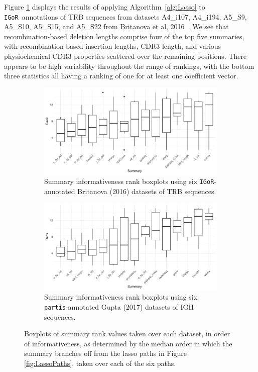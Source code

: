 \documentclass{article}
\newcommand{\partis}{\texttt{partis}}
\newcommand{\igor}{\texttt{IGoR}}
\begin{document}
Figure \ref{fig:IgorLassoScores} displays the results of applying Algorithm~\ref{alg:Lasso} to \igor\ annotations of TRB sequences from datasets A4\_i107, A4\_i194, A5\_S9, A5\_S10, A5\_S15, and A5\_S22 from Britanova et al, 2016~\cite{Britanova2016-iw}.
We see that recombination-based deletion lengths comprise four of the top five summaries, with recombination-based insertion lengths, CDR3 length, and various physiochemical CDR3 properties scattered over the remaining positions.
There appears to be high variability throughout the range of rankings, with the bottom three statistics all having a ranking of one for at least one coefficient vector.
\begin{figure}
        \begin{subfigure}{\linewidth}
    	\includegraphics[width=\linewidth]{Figures/Lasso/igor_lasso_scores.pdf}
		\caption{Summary informativeness rank boxplots using six \igor-annotated Britanova (2016) datasets of TRB sequences.}
		\label{fig:IgorLassoScores}
    \end{subfigure}
    \begin{subfigure}{\linewidth}
    	\includegraphics[width=\linewidth]{Figures/Lasso/partis_lasso_scores.pdf}
		\caption{Summary informativeness rank boxplots using six \partis-annotated Gupta (2017) datasets of IGH sequences.}
		\label{fig:PartisLassoScores}
    \end{subfigure}
    \caption{Boxplots of summary rank values taken over each dataset, in order of informativeness, as determined by the median order in which the summary branches off from the lasso paths in Figure \ref{fig:LassoPaths}, taken over each of the six paths.}
    \label{fig:LassoScores}
\end{figure}
\end{document}

